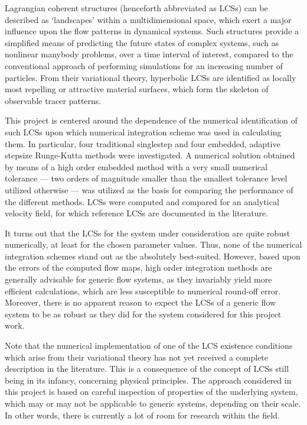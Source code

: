 Lagrangian coherent structures (henceforth abbreviated as LCSs) can be described
as `landscapes' within a multidimensional space, which exert a major influence
upon the flow patterns in dynamical systems. Such structures provide a
simplified means of predicting the future states of complex systems, such as
nonlinear manybody problems, over a time interval of interest, compared to the
conventional approach of performing simulations for an increasing number of
particles. From their variational theory, hyperbolic LCSs are identified as
locally most repelling or attractive material surfaces, which form the skeleton
of observable tracer patterns.

This project is centered around the dependence of the numerical identification
of such LCSs upon which numerical integration scheme was used in calculating
them. In particular, four traditional singlestep and four embedded, adaptive
stepsize Runge-Kutta methods were investigated.
A numerical solution obtained by means of a high order embedded method with
a very small numerical tolerance --- two orders of magnitude smaller than the
smallest tolerance level utilized otherwise --- was utilized as the basis
for comparing the performance of the different methods. LCSs were computed and
compared for an analytical velocity field, for which reference LCSs are
documented in the literature.

It turns out that the LCSs for the system under consideration are quite robust
numerically, at least for the chosen parameter values. Thus, none of the
numerical integration schemes stand out as the absolutely best-suited. However,
based upon the errors of the computed flow maps, high order integration
methods are generally advisable for generic flow systems, as they invariably
yield more efficient calculations, which are less susceptible to numerical
round-off error. Moreover, there is no apparent reason to expect the LCSs of
a generic flow system to be as robust as they did for the system considered
for this project work.

Note that the numerical implementation of one of the LCS existence conditions
which arise from their variational theory has not yet received a complete
description in the literature. This is a consequence of the concept of LCSs
still being in its infancy, concerning physical principles. The approach
considered in this project is based on careful inspection of properties of the
underlying system, which may or may not be applicable to generic systems,
depending on their scale. In other words, there is currently a lot of room for
research within the field.


